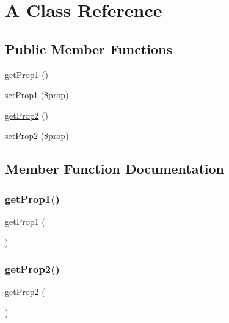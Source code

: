 \hypertarget{class_deep_copy_1_1f002_1_1_a}{}\section{A Class Reference}
\label{class_deep_copy_1_1f002_1_1_a}
\subsection*{Public Member Functions}
\begin{DoxyCompactItemize}
\item 
\mbox{\hyperlink{class_deep_copy_1_1f002_1_1_a_a3fbd387101de2809dc0ea9a0eddac0b2}{get\+Prop1}} ()
\item 
\mbox{\hyperlink{class_deep_copy_1_1f002_1_1_a_ac7c0737dc43da27257ca2d769734ca21}{set\+Prop1}} (\$prop)
\item 
\mbox{\hyperlink{class_deep_copy_1_1f002_1_1_a_a5691fa113616191da0c95d81e8990952}{get\+Prop2}} ()
\item 
\mbox{\hyperlink{class_deep_copy_1_1f002_1_1_a_a9ed1216689ffd26b8079935ee8925be5}{set\+Prop2}} (\$prop)
\end{DoxyCompactItemize}


\subsection{Member Function Documentation}
\mbox{\label{class_deep_copy_1_1f002_1_1_a_a3fbd387101de2809dc0ea9a0eddac0b2}} 
\subsubsection{\texorpdfstring{get\+Prop1()}{getProp1()}}
{\footnotesize\ttfamily get\+Prop1 (\begin{DoxyParamCaption}{ }\end{DoxyParamCaption})}

\mbox{\label{class_deep_copy_1_1f002_1_1_a_a5691fa113616191da0c95d81e8990952}} 
\subsubsection{\texorpdfstring{get\+Prop2()}{getProp2()}}
{\footnotesize\ttfamily get\+Prop2 (\begin{DoxyParamCaption}{ }\end{DoxyParamCaption})}

